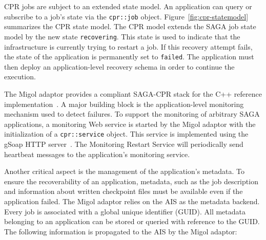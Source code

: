 \documentclass[times, 10pt, twocolumn]{article}
\begin{document}
CPR jobs are subject to an extended state model. An application can query or subscribe to a job's state via the \texttt{cpr::job} object.      
Figure~\ref{fig:cpr-statemodel} summarizes the CPR state model. The CPR model extends the SAGA job state model by the new state \texttt{recovering}. This state
is used to indicate that the infrastructure is currently trying to restart a job. 
If this recovery attempt fails, the state of the application is permanently set to \texttt{failed}. 
The application must then deploy an application-level recovery schema in order to continue the execution. 


The Migol adaptor provides a compliant SAGA-CPR stack for the C++ reference implementation~\cite{Kaiser:2006qp}. 
A major building block is the application-level monitoring mechanism used to detect failures. 
To support the monitoring of arbitrary SAGA applications, a monitoring Web service is started 
by the Migol adaptor with the initialization of a \texttt{cpr::service} object. This 
service is implemented using the gSoap HTTP server~\cite{gsoap}.  The Monitoring Restart Service will 
periodically send heartbeat messages to the application's monitoring service.



Another critical aspect is the management of the application's
metadata. To ensure the recoverability of an application, metadata,
such as the job description and information about written checkpoint
files must be available even if the application failed. The Migol
adaptor relies on the AIS as the metadata backend. Every job is
associated with a global unique identifier (GUID).
All metadata belonging to an application can be stored or queried with
reference to the GUID.  The following information is propagated to the
AIS by the Migol adaptor:
\end{document}
